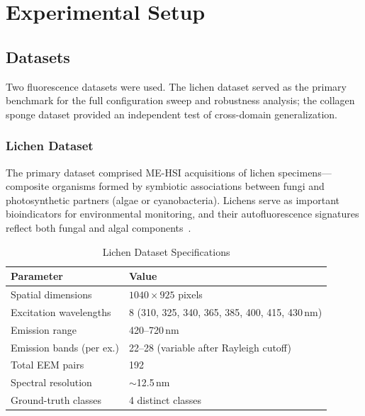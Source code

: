 \section{Experimental Setup}
\label{sec:experimental_setup}

\subsection{Datasets}
\label{sec:datasets}

Two fluorescence datasets were used. The lichen dataset served as the primary benchmark for the full configuration sweep and robustness analysis; the collagen sponge dataset provided an independent test of cross-domain generalization.

\subsubsection{Lichen Dataset}
\label{sec:dataset_lichen}

The primary dataset comprised ME-HSI acquisitions of lichen specimens---composite organisms formed by symbiotic associations between fungi and photosynthetic partners (algae or cyanobacteria).
Lichens serve as important bioindicators for environmental monitoring, and their autofluorescence signatures reflect both fungal and algal components~\cite{meysurova2021optical}.

\begin{table}[!t]
\centering
\caption{Lichen Dataset Specifications}
\label{tab:dataset}
\begin{tabular}{@{}ll@{}}
\toprule
\textbf{Parameter} & \textbf{Value} \\
\midrule
Spatial dimensions & $1040 \times 925$ pixels \\
Excitation wavelengths & 8 (310, 325, 340, 365, 385, 400, 415, 430\,nm) \\
Emission range & 420--720\,nm \\
Emission bands (per ex.) & 22--28 (variable after Rayleigh cutoff) \\
Total EEM pairs & 192 \\
Spectral resolution & $\sim$12.5\,nm \\
Ground-truth classes & 4 distinct classes \\
\bottomrule
\end{tabular}
\end{table}

